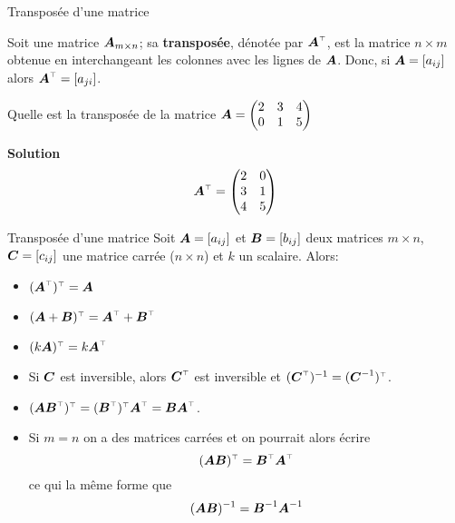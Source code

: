 \documentclass[french]{beamer}
\begin{document}
\begin{frame}{Transposée d'une matrice }

Soit une matrice $\boldsymbol{A}_{m\times n}$; sa \textbf{transposée}, dénotée par $\transp{\matA}$,
est la matrice $n\times m$ obtenue en interchangeant les colonnes avec
les lignes de $\boldsymbol{A}$.  Donc, si $\boldsymbol{A} = [a_{ij}]$ alors $\transp{\matA} = [a_{ji}]$.

\begin{example}
    Quelle est la transposée de la matrice $\displaystyle 
    \boldsymbol{A} = \begin{pmatrix}
        2 & 3 & 4 \\
        0 & 1 & 5
        \end{pmatrix}
    $

\textbf{Solution}
    \[
    \transp{\matA} = \begin{pmatrix}
                2 & 0\\
                3 & 1 \\
                4 & 5
        \end{pmatrix}
    \]
\end{example}



\end{frame}

\begin{frame}{Transposée d'une matrice }
    Soit $\boldsymbol{A}=[a_{ij}]$ et $\boldsymbol{B} = [b_{ij}]$ deux matrices $m\times n$, $\boldsymbol{C} = [c_{ij}]$ une
    matrice carrée ($n\times n$) et $k$ un scalaire.  Alors:
\begin{itemize}
\item $\transp{(\transp{\matA})} = \matA$
\item $\transp{(\matA+\matB)} = \transp{\matA} + \transp{\matB}$
\item $ \transp{(k\matA)} = k \transp{\matA}$
\item Si $\boldsymbol{C}$ est inversible, alors $\transp{\matC}$ est inversible et $(\transp{\matC})^{-1} = \transp{(\matC^{-1})}$.
\item $\transp{(\matA \transp{\matB})} = \transp{(\transp{\matB})} \transp{\matA} 
= \matB \transp{\matA}$. 
\item Si $m=n$ on a des matrices carrées et on pourrait alors écrire \[\transp{(\matA\matB)} = \transp{\matB}\transp{\matA}\]
ce qui la même forme que
\[(\boldsymbol{A}\boldsymbol{B})^{-1} = \boldsymbol{B}^{-1}\boldsymbol{A}^{-1}\]
\end{itemize}

\end{frame}
\end{document}
